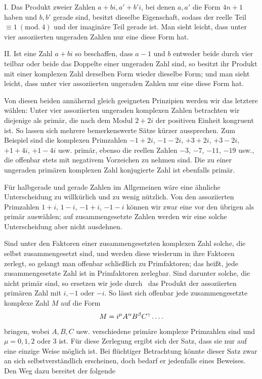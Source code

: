 I. Das Produkt zweier Zahlen $a+bi,a'+b'i$, bei denen $a,a'$ die Form $4n+1$ haben und $b,b'$ gerade sind, besitzt dieselbe Eigenschaft, sodass der reelle Teil $\equiv1\ (\mathrm{mod.}\ 4)$ und der imaginäre Teil gerade ist. Man sieht leicht, dass unter vier assoziierten ungeraden Zahlen nur eine diese Form hat.

II. Ist eine Zahl $a+bi$ so beschaffen, dass $a-1$ und $b$ entweder beide durch vier teilbar oder beide das Doppelte einer ungeraden Zahl sind, so besitzt ihr Produkt mit einer komplexen Zahl derselben Form wieder dieselbe Form; und man sieht leicht, dass unter vier assoziierten ungeraden Zahlen nur eine diese Form hat.

Von diesen beiden annähernd gleich geeigneten Prinzipien werden wir das letztere wählen: Unter vier assoziierten ungeraden komplexen Zahlen betrachten wir diejenige als primär, die nach dem Modul $2+2i$ der positiven Einheit kongruent ist. So lassen sich mehrere bemerkenswerte Sätze kürzer aussprechen. Zum Beispiel sind die komplexen Primzahlen $-1+2i$, $-1-2i$, $+3+2i$, $+3-2i$, $+1+4i$, $+1-4i$ usw. primär, ebenso die reellen Zahlen $-3$, $-7$, $-11$, $-19$ usw., die offenbar stets mit negativem Vorzeichen zu nehmen sind. Die zu einer ungeraden primären komplexen Zahl konjugierte Zahl ist ebenfalls primär.

Für halbgerade und gerade Zahlen im Allgemeinen wäre eine ähnliche Unterscheidung zu willkürlich und zu wenig nützlich. Von den assoziierten Primzahlen $1+i$, $1-i$, $-1+i$, $-1-i$ können wir zwar eine vor den übrigen als primär auswählen; auf zusammengesetzte Zahlen werden wir eine solche Unterscheidung aber nicht ausdehnen.

Sind unter den Faktoren einer zusammengesetzten komplexen Zahl solche, die selbst zusammengesetzt sind, und werden diese wiederum in ihre Faktoren zerlegt, so gelangt man offenbar schließlich zu Primfaktoren; das heißt, jede zusammengesetzte Zahl ist in Primfaktoren zerlegbar. Sind darunter solche, die nicht primär sind, so ersetzen wir jede durch\ %
das Produkt der assoziierten primären Zahl mit $i,-1$ oder $-i$. So lässt sich offenbar jede zusammengesetzte komplexe Zahl $M$ auf die Form
\[
M=i^\mu A^\alpha B^\beta C^\gamma\mathinner{.\,.\,.\,.}
\]
bringen, wobei $A,B,C$ usw. verschiedene primäre komplexe Primzahlen sind und $\mu=0,1,2$ oder $3$ ist. Für diese Zerlegung ergibt sich der Satz, dass sie nur auf eine einzige Weise möglich ist. Bei flüchtiger Betrachtung könnte dieser Satz zwar an sich selbstverständlich erscheinen, doch bedarf er jedenfalls eines Beweises. Den Weg dazu bereitet der folgende

